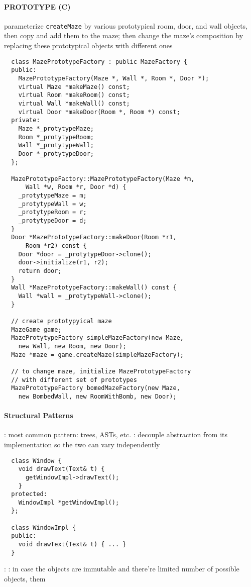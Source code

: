 \documentclass{memo}
\begin{document}
\paragraph{PROTOTYPE (C)}
\bit
\w parameterize {\tt createMaze} by various prototypical room, door, and wall
objects, then copy and add them to the maze; then change the maze's
composition by replacing these prototypical objects with different ones
{\scriptsize
\begin{verbatim}
  class MazePrototypeFactory : public MazeFactory {
  public:
    MazePrototypeFactory(Maze *, Wall *, Room *, Door *);
    virtual Maze *makeMaze() const;
    virtual Room *makeRoom() const;
    virtual Wall *makeWall() const;
    virtual Door *makeDoor(Room *, Room *) const;
  private:
    Maze *_protytypeMaze;
    Room *_protytypeRoom;
    Wall *_protytypeWall;
    Door *_protytypeDoor;
  };

  MazePrototypeFactory::MazePrototypeFactory(Maze *m, 
      Wall *w, Room *r, Door *d) {
    _protytypeMaze = m;
    _protytypeWall = w;
    _protytypeRoom = r;
    _protytypeDoor = d;
  }
  Door *MazePrototypeFactory::makeDoor(Room *r1, 
      Room *r2) const {
    Door *door = _protytypeDoor->clone();
    door->initialize(r1, r2);
    return door;
  }
  Wall *MazePrototypeFactory::makeWall() const {
    Wall *wall = _protytypeWall->clone();
  }

  // create prototypyical maze
  MazeGame game;
  MazeProtytypeFactory simpleMazeFactory(new Maze,
    new Wall, new Room, new Door);
  Maze *maze = game.createMaze(simpleMazeFactory);

  // to change maze, initialize MazePrototypeFactory
  // with different set of prototypes
  MazePrototypeFactory bomedMazeFactory(new Maze,
    new BombedWall, new RoomWithBomb, new Door);
\end{verbatim}
}
\eit

\paragraph{Structural Patterns}
\bit
\w {}: 
  \bit
  \w most common pattern: trees, ASTs, etc.
  \eit
\w {}:
  \bit
  \w decouple abstraction from its implementation so the two can vary
  independently
{\scriptsize
\begin{verbatim}
  class Window {
    void drawText(Text& t) {
      getWindowImpl->drawText();
    }
  protected:
    WindowImpl *getWindowImpl();
  };

  class WindowImpl {
  public:
    void drawText(Text& t) { ... }
  }
\end{verbatim}
}
  \eit
\w {}:
\w {}: 
  \bit
  \w in case the objects are immutable and there're limited
number of possible objects,  them 
  \eit
\eit
\end{document}
